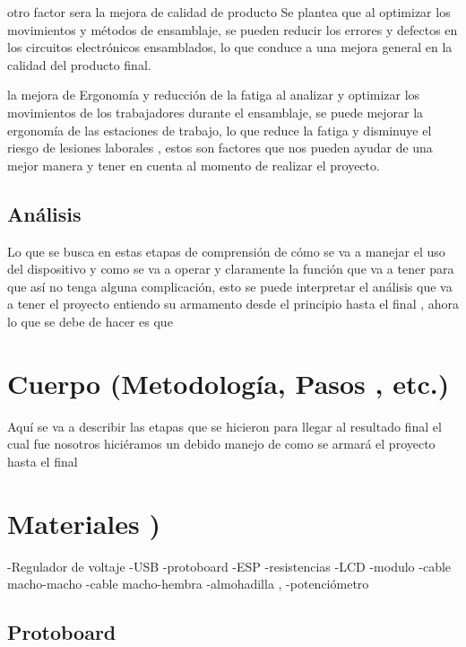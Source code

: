     otro factor sera la mejora de calidad de producto Se plantea que al optimizar los movimientos y métodos de ensamblaje, se pueden reducir los errores y defectos en los circuitos electrónicos ensamblados, lo que conduce a una mejora general en la calidad del producto final. \newline
    
    la mejora de Ergonomía y reducción de la fatiga  al analizar y optimizar los movimientos de los trabajadores durante el ensamblaje, se puede mejorar la ergonomía de las estaciones de trabajo, lo que reduce la fatiga y disminuye el riesgo de lesiones laborales , estos son factores que nos pueden ayudar de una mejor manera y tener en cuenta al momento de realizar el proyecto. \newline
    
    \subsection{ Análisis}
    Lo que se busca en estas etapas de comprensión de cómo se va a manejar el uso del dispositivo  y como se va a operar y claramente la función que va a tener para que así no tenga  alguna complicación,  esto se puede interpretar el análisis que va a tener el proyecto entiendo su armamento  desde el principio hasta el final , ahora lo que se debe de hacer es que
    
    \section{Cuerpo (Metodología, Pasos , etc.)}
    
    Aquí se va a describir las etapas que se hicieron para llegar al resultado final el cual fue nosotros hiciéramos un debido manejo de como se armará el proyecto hasta el final
    
    \section{Materiales )}
    
    -Regulador de voltaje 
    -USB 
    -protoboard 
    -ESP 
    -resistencias 
    -LCD 
    -modulo 
    -cable macho-macho 
    -cable macho-hembra 
    -almohadilla ,
    -potenciómetro 
    
    \subsection{Protoboard }
    
